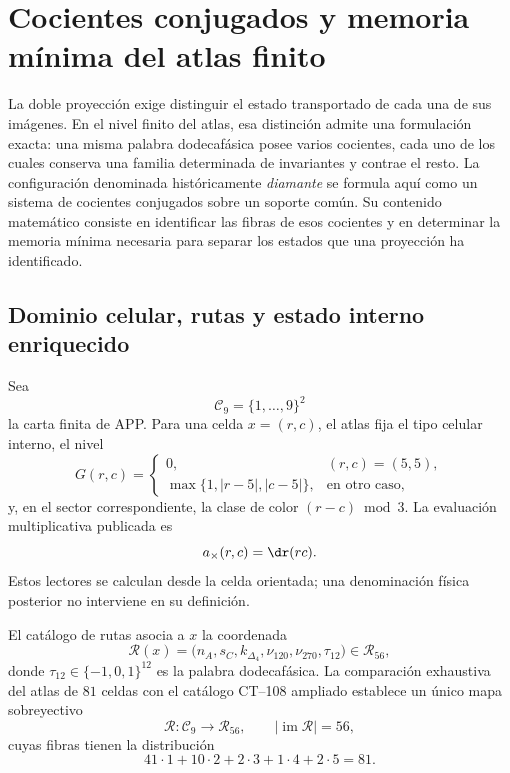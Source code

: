 \section[Cocientes conjugados y memoria mínima]{Cocientes conjugados y
memoria mínima del atlas finito}
\label{sec:cocientes-conjugados-rev11}

La doble proyección exige distinguir el estado transportado de cada una de
sus imágenes. En el nivel finito del atlas, esa distinción admite una
formulación exacta: una misma palabra dodecafásica posee varios cocientes,
cada uno de los cuales conserva una familia determinada de invariantes y
contrae el resto. La configuración denominada históricamente
\emph{diamante} se formula aquí como un sistema de cocientes conjugados sobre
un soporte común. Su contenido matemático consiste en identificar las fibras
de esos cocientes y en determinar la memoria mínima necesaria para separar
los estados que una proyección ha identificado.

\subsection{Dominio celular, rutas y estado interno enriquecido}

Sea
\[
 \mathcal C_9=\{1,\ldots,9\}^2
\]
la carta finita de APP. Para una celda \(x=(r,c)\), el atlas fija el tipo
celular interno, el nivel
\[
 G(r,c)=
 \begin{cases}
 0,&(r,c)=(5,5),\\
 \max\{1,|r-5|,|c-5|\},&\text{en otro caso},
 \end{cases}
\]
y, en el sector correspondiente, la clase de color \((r-c)\bmod 3\). La
evaluación multiplicativa publicada es
\[
 a_{\times}(r,c)=\dr(rc).
\]
Estos lectores se calculan desde la celda orientada; una denominación física
posterior no interviene en su definición.

El catálogo de rutas asocia a \(x\) la coordenada
\[
 \mathcal R(x)=
 \bigl(n_A,s_C,k_{\Delta_4},\nu_{120},\nu_{270},\tau_{12}\bigr)
 \in\mathscr R_{56},
\]
donde \(\tau_{12}\in\{-1,0,1\}^{12}\) es la palabra dodecafásica. La
comparación exhaustiva del atlas de \(81\) celdas con el catálogo CT--108
ampliado establece un único mapa sobreyectivo
\[
 \mathcal R:\mathcal C_9\longrightarrow\mathscr R_{56},
 \qquad |\operatorname{im}\mathcal R|=56,
\]
cuyas fibras tienen la distribución
\begin{equation}
 41\cdot1+10\cdot2+2\cdot3+1\cdot4+2\cdot5=81.
 \label{eq:fibras-r56-rev11}
\end{equation}


